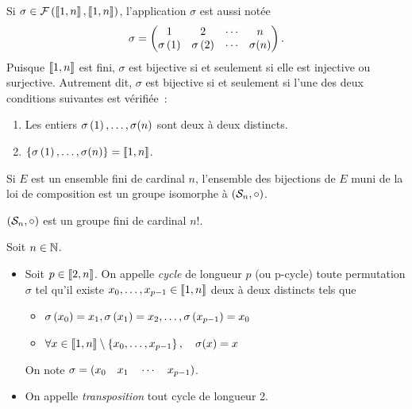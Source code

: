 \documentclass{magnolia}
\begin{document}
\begin{remarques}
\remarque Si $\sigma\in\mathcal{F}\left(\left\llbracket 1,n\right\rrbracket,\left\llbracket 1,n\right\rrbracket\right)$, l'application
  $\sigma$ est aussi notée
  \[\sigma=
    \begin{pmatrix}
    1 & 2 & \cdots & n\\
    \sigma\left(1\right) & \sigma\left(2\right) & \cdots & \sigma(n)
    \end{pmatrix}.\]
  Puisque $\left\llbracket 1,n\right\rrbracket$ est fini, $\sigma$ est bijective si et seulement si
  elle est injective ou surjective. Autrement dit, $\sigma$ est bijective si
  et seulement si l'une des deux conditions suivantes est vérifiée~:
  \begin{enumerate}
  \item Les entiers $\sigma\left(1\right),\ldots,\sigma(n)$ sont deux à deux distincts.
  \item $\left\{\sigma\left(1\right),\ldots,\sigma(n)\right\}=\left\llbracket 1,n\right\rrbracket$.
  \end{enumerate}
\remarque Si $E$ est un ensemble fini de cardinal $n$, l'ensemble des bijections
  de $E$ muni de la loi de composition est un groupe isomorphe à
  $(\mathcal{S}_{n},\circ)$.
\end{remarques}

\begin{proposition}
$\left(\mathcal{S}_{n},\circ\right)$ est un groupe fini de cardinal $n!$.  
\end{proposition}

\begin{definition}
Soit $n\in\mathbb{N}$.
\begin{itemize}
\item Soit $p\in\left\llbracket 2,n\right\rrbracket$. On appelle \emph{cycle} de longueur $p$
  (ou p-cycle) toute
  permutation $\sigma$ tel qu'il existe $x_0,\ldots,x_{p-1}\in\left\llbracket 1,n\right\rrbracket$ deux à
  deux distincts tels que
  \begin{itemize}
  \item $\sigma\left(x_0\right)=x_1,\sigma\left(x_1\right)=x_2,\ldots,\sigma\left(x_{p-1}\right)=x_0$
  \item $\forall x\in\left\llbracket 1,n\right\rrbracket\setminus\left\{x_0,\ldots,x_{p-1}\right\} ,\quad
         \sigma(x)=x$
  \end{itemize}
  On note $\sigma=\left(x_0 \quad x_1 \quad \cdots \quad x_{p-1}\right)$.
\item On appelle \emph{transposition} tout cycle de longueur 2.
\end{itemize}
\end{definition}
\end{document}
